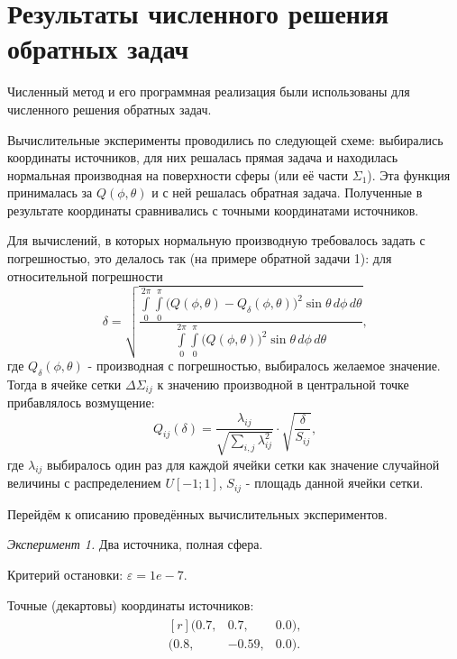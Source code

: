 \section{Результаты численного решения обратных задач}

Численный метод и его программная реализация были использованы для численного решения обратных задач.

Вычислительные эксперименты проводились по следующей схеме: выбирались координаты источников, для них решалась прямая задача и находилась нормальная производная на поверхности сферы (или её части $\Sigma_1$). Эта функция принималась за $Q(\phi, \theta)$ и с ней решалась обратная задача. Полученные в результате координаты сравнивались с точными координатами источников.

Для вычислений, в которых нормальную производную требовалось задать с погрешностью, это делалось так (на примере обратной задачи 1): для относительной погрешности
\begin{equation}
    \delta =
    \sqrt{
        \frac
        {\int\limits_{0}^{2\pi}\int\limits_{0}^{\pi}
        \big(
        Q (\phi,\theta) - Q_\delta (\phi, \theta)
        \big)^2
        \sin{\theta} \, d\phi \, d\theta
        }
        {\int\limits_{0}^{2\pi}\int\limits_{0}^{\pi}
        \big(
        Q (\phi,\theta)
        \big)^2
        \sin{\theta} \, d\phi \, d\theta
        }
    }
    \text{,}
\end{equation}
где $Q_\delta(\phi, \theta)$ - производная с погрешностью, выбиралось желаемое значение. Тогда в ячейке сетки $\Delta \Sigma_{ij}$ к значению производной в центральной точке прибавлялось возмущение:
\begin{equation}
    Q_{ij}(\delta) = \frac{\lambda_{ij}}{\sqrt{\sum_{i,j} \lambda_{ij}^2}} \cdot \sqrt{\frac{\delta}{S_{ij}}} \text{,}
\end{equation}
где $\lambda_{ij}$ выбиралось один раз для каждой ячейки сетки как значение случайной величины с распределением $U[-1;1]$, $S_{ij}$ - площадь данной ячейки сетки.

Перейдём к описанию проведённых вычислительных экспериментов.

\emph{Эксперимент 1.} Два источника, полная сфера.

Критерий остановки: $\varepsilon = 1e-7$.

Точные (декартовы) координаты источников:
\begin{align*}
    \begin{matrix*}[r]
    (0.7, & 0.7, & 0.0) \text{,}\\
    (0.8, & -0.59, & 0.0) \text{.}
    \end{matrix*}
\end{align*}

